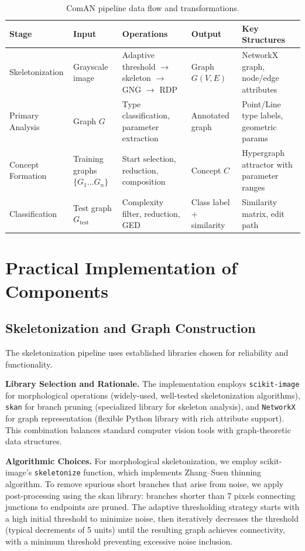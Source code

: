 \documentclass[12pt, a4paper]{article}
\begin{document}
\begin{table}[h]
\centering
\caption{ComAN pipeline data flow and transformations.}
\label{tab:dataflow}
\begin{tabular}{p{2.5cm}p{2.2cm}p{4cm}p{2cm}p{3.5cm}}
\toprule
\textbf{Stage} & \textbf{Input} & \textbf{Operations} & \textbf{Output} & \textbf{Key Structures} \\
\midrule
Skeletonization & Grayscale image & Adaptive threshold $\rightarrow$ skeleton $\rightarrow$ GNG $\rightarrow$ RDP & Graph $G(V,E)$ & NetworkX graph, node/edge attributes \\
\midrule
Primary Analysis & Graph $G$ & Type classification, parameter extraction & Annotated graph & Point/Line type labels, geometric params \\
\midrule
Concept Formation & Training graphs $\{G_1 \dots G_n\}$ & Start selection, reduction, composition & Concept $C$ & Hypergraph attractor with parameter ranges \\
\midrule
Classification & Test graph $G_{\text{test}}$ & Complexity filter, reduction, GED & Class label + similarity & Similarity matrix, edit path \\
\bottomrule
\end{tabular}
\end{table}

\newpage

\section{Practical Implementation of Components}

\subsection{Skeletonization and Graph Construction}

The skeletonization pipeline uses established libraries chosen for reliability and functionality.

\textbf{Library Selection and Rationale.} The implementation employs \texttt{scikit-image} for morphological operations (widely-used, well-tested skeletonization algorithms), \texttt{skan} for branch pruning (specialized library for skeleton analysis), and \texttt{NetworkX} for graph representation (flexible Python library with rich attribute support). This combination balances standard computer vision tools with graph-theoretic data structures.

\textbf{Algorithmic Choices.} For morphological skeletonization, we employ scikit-image's \texttt{skeletonize} function, which implements Zhang--Suen thinning algorithm. To remove spurious short branches that arise from noise, we apply post-processing using the skan library: branches shorter than 7 pixels connecting junctions to endpoints are pruned. The adaptive thresholding strategy starts with a high initial threshold to minimize noise, then iteratively decreases the threshold (typical decrements of 5 units) until the resulting graph achieves connectivity, with a minimum threshold preventing excessive noise inclusion.
\end{document}
